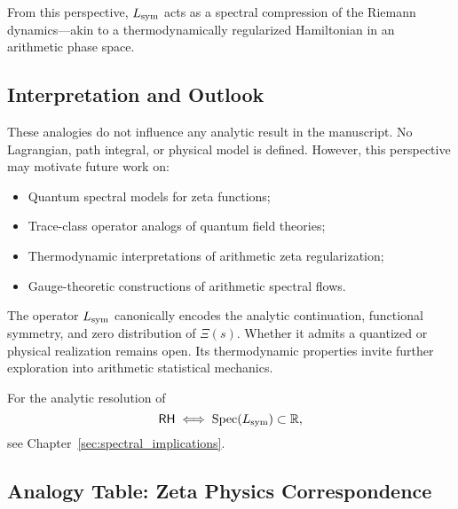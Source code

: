 From this perspective, \( L_{\mathrm{sym}} \) acts as a spectral compression of the Riemann dynamics—akin to a thermodynamically regularized Hamiltonian in an arithmetic phase space.

\subsection*{Interpretation and Outlook}

These analogies do not influence any analytic result in the manuscript. No Lagrangian, path integral, or physical model is defined. However, this perspective may motivate future work on:
\begin{itemize}
  \item Quantum spectral models for zeta functions;
  \item Trace-class operator analogs of quantum field theories;
  \item Thermodynamic interpretations of arithmetic zeta regularization;
  \item Gauge-theoretic constructions of arithmetic spectral flows.
\end{itemize}

\medskip
\noindent
The operator \( L_{\mathrm{sym}} \) canonically encodes the analytic continuation, functional symmetry, and zero distribution of \( \Xi(s) \). Whether it admits a quantized or physical realization remains open. Its thermodynamic properties invite further exploration into arithmetic statistical mechanics.

\medskip
\noindent
For the analytic resolution of
\[
\mathsf{RH} \iff \operatorname{Spec}(L_{\mathrm{sym}}) \subset \mathbb{R},
\]
see Chapter~\ref{sec:spectral_implications}.

\subsection*{Analogy Table: Zeta Physics Correspondence}

